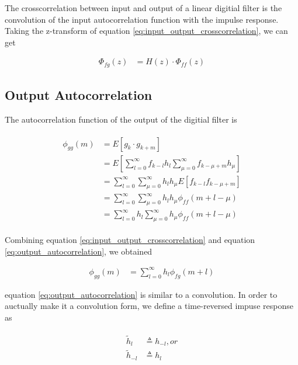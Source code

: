\documentclass[8pt,a4paper]{article}
\begin{document}
\begin{multicols}{2}
The crosscorrelation between input and output of a linear digitial filter is the convolution of the input autocorrelation function with the impulse response.
Taking the z-transform of equation \ref{eq:input_output_crosscorrelation}, we can get 

\begin{align}
  \Phi_{fg}(z)&=H(z) \cdot \Phi_{ff}(z)
\end{align}

\subsection*{Output Autocorrelation}
The autocorrelation function of the output of the digitial filter is

\begin{align}
  \label{eq:output_autocorrelation}
  \begin{split}
    \phi_{gg}(m)&= E \left[ g_{k} \cdot g_{k+m} \right] \\
                &= E \left[  \sum_{l=0}^{\infty} f_{k-l}h_{l} \sum_{\mu=0}^{\infty} f_{k-\mu+m}h_{\mu}  \right] \\
                &= \sum_{l=0}^{\infty} \sum_{\mu=0}^{\infty} h_{l} h_{\mu} E \left[ f_{k-l} f_{k-\mu +m} \right] \\
                &= \sum_{l=0}^{\infty} \sum_{\mu=0}^{\infty} h_{l} h_{\mu} \phi_{ff}(m+l-\mu) \\
                &= \sum_{l=0}^{\infty} h_{l} \sum_{\mu=0}^{\infty} h_{\mu} \phi_{ff}(m+l-\mu)
  \end{split}
\end{align}

Combining equation \ref{eq:input_output_crosscorrelation} and equation \ref{eq:output_autocorrelation}, we obtained

\begin{align}
  \label{eq:output_autocorrelation_2}
  \phi_{gg}(m) &= \sum_{l=0}^{\infty} h_{l} \phi_{fg}(m+l)
\end{align}

equation \ref{eq:output_autocorrelation} is similar to a convolution. In order to auctually make it a convolution form, we define a time-reversed impuse response as

\begin{align}
  \begin{split}
  \tilde{h}_{l} &\triangleq h_{-l}, or \\
  \tilde{h}_{-l} &\triangleq h_{l}
  \end{split}
\end{align}


\end{multicols}
\end{document}
